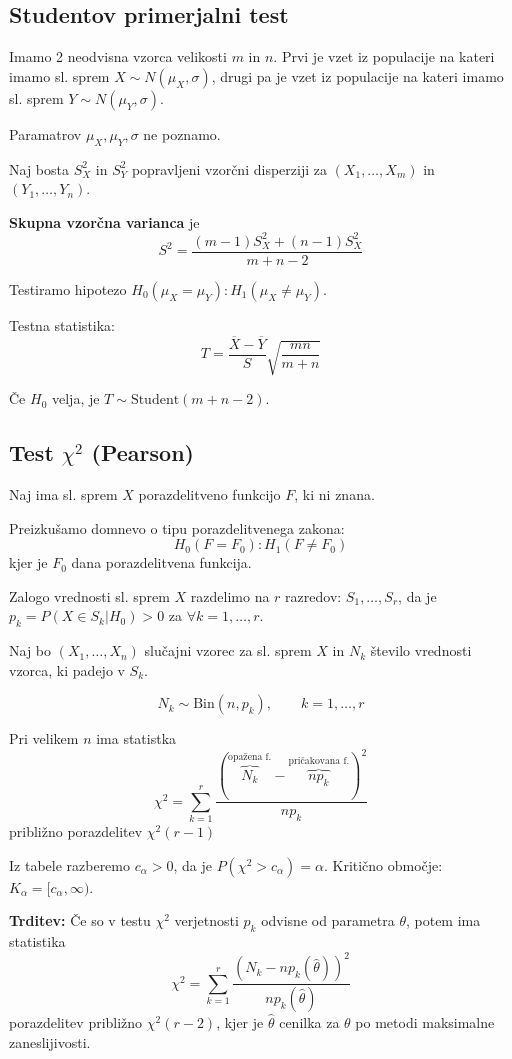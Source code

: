 \begin{multicols}{5}
\subsection{Studentov primerjalni test}
Imamo 2 neodvisna vzorca velikosti $m$ in $n$. Prvi je vzet iz populacije na kateri imamo sl. sprem $X \sim N(\mu_X, \sigma)$, drugi pa je 
vzet iz populacije na kateri imamo sl. sprem $Y \sim N(\mu_Y, \sigma)$. 

Paramatrov $\mu_X, \mu_Y, \sigma$ ne poznamo.

Naj bosta $S_X^2$ in $S_Y^2$ popravljeni vzorčni disperziji za $(X_1, \dots, X_m)$ in $(Y_1, \dots, Y_n)$.

\textbf{Skupna vzorčna varianca} je
\[ S^2 = \frac{(m-1)S_X^2 + (n-1)S_X^2}{m+n-2}\]

Testiramo hipotezo $H_0(\mu_X = \mu_Y) : H_1(\mu_X \neq \mu_Y)$.

Testna statistika:
\[ T = \frac{\overline{X} - \overline{Y}}{S}\sqrt{\frac{mn}{m+n}}\]

Če $H_0$ velja, je $T \sim \text{Student}(m+n-2)$.

\subsection{Test $\chi^2$ (Pearson)}
Naj ima sl. sprem $X$ porazdelitveno funkcijo $F$, ki ni znana.

Preizkušamo domnevo o tipu porazdelitvenega zakona:
\[ H_0(F = F_0) : H_1(F \neq F_0)\]
kjer je $F_0$ dana porazdelitvena funkcija.

Zalogo vrednosti sl. sprem $X$ razdelimo na $r$ razredov: $S_1, \dots, S_r$, da je $p_k = P(X \in S_k | H_0) > 0$ za $\forall k = 1, \dots, r$.

Naj bo $(X_1, \dots, X_n)$ slučajni vzorec za sl. sprem $X$ in $N_k$ število vrednosti vzorca, ki padejo v $S_k$. 

\[ N_k \sim \text{Bin}(n, p_k), \qquad k = 1, \dots, r\]

Pri velikem $n$ ima statistka
\[\chi^2 = \sum_{k=1}^r \frac{(\overbrace{N_k}^{\text{opažena f.}} - \overbrace{np_k}^{\text{pričakovana f.}})^2}{np_k}\]
približno porazdelitev $\chi^2(r-1)$

Iz tabele razberemo $c_{\alpha} > 0$, da je $P(\chi^2 > c_{\alpha}) = \alpha$. Kritično območje: $K_{\alpha} = [c_{\alpha}, \infty)$.

\textbf{Trditev:} Če so v testu $\chi^2$ verjetnosti $p_k$ odvisne od parametra $\theta$, potem ima statistika
\[ \chi^2 = \sum_{k=1}^r \frac{({N_k} - {np_k(\hat{\theta})})^2}{np_k(\hat{\theta})}\]
porazdelitev približno $\chi^2(r-2)$, kjer je $\hat{\theta}$ cenilka za $\theta$ po metodi maksimalne zaneslijivosti.


\end{multicols}
